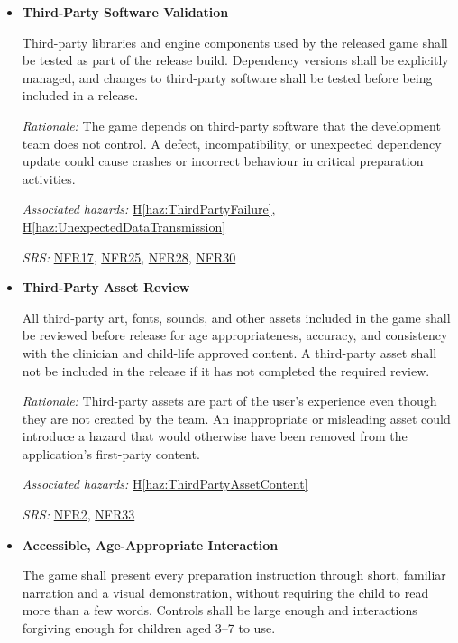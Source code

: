 \documentclass{article}
\newcounter{hazard}
\newcommand{\hazref}[1]{\hyperref[haz:#1]{H\ref*{haz:#1}}}
\newcounter{sr}
\newcommand{\srdef}[1]{\refstepcounter{sr}\label{sr:#1}\textbf{SR-\thesr:}}
\newcommand{\srsurl}{https://team-hindsight.github.io/ophthamology-game/SRS/SRS.pdf}
\newcommand{\srsnfrref}[2]{\href{\srsurl\#nameddest=#1}{NFR#2}}
\begin{document}
\begin{itemize}[leftmargin=1.5cm, labelwidth=1.3cm, labelsep=0.2cm,
  align=left, itemsep=1.2em, parsep=0.6em]
\textit{SRS:} \srsnfrref{NFR_DataProtection}{26}, \srsnfrref{NFR_Privacy}{28}, \srsnfrref{NFR_Minimization}{29}

\item[\srdef{ThirdPartyValidation}]
\textbf{Third-Party Software Validation}

Third-party libraries and engine components
used by the released game shall be tested as
part of the release build. Dependency versions
shall be explicitly managed, and changes to
third-party software shall be tested before
being included in a release.

\textit{Rationale:}
The game depends on third-party software that
the development team does not control. A defect,
incompatibility, or unexpected dependency update
could cause crashes or incorrect behaviour in
critical preparation activities.

\textit{Associated hazards:}
\hazref{ThirdPartyFailure}, \hazref{UnexpectedDataTransmission}

\textit{SRS:} \srsnfrref{NFR_Reliability}{17}, \srsnfrref{NFR_DependencyTesting}{25}, \srsnfrref{NFR_Privacy}{28}, \srsnfrref{NFR_Immunity}{30}

\item[\srdef{ThirdPartyAssetReview}]
\textbf{Third-Party Asset Review}

All third-party art, fonts, sounds, and other
assets included in the game shall be reviewed
before release for age appropriateness,
accuracy, and consistency with the clinician
and child-life approved content. A third-party
asset shall not be included in the release if
it has not completed the required review.

\textit{Rationale:}
Third-party assets are part of the user's
experience even though they are not created by
the team. An inappropriate or misleading asset
could introduce a hazard that would otherwise
have been removed from the application's
first-party content.

\textit{Associated hazards:}
\hazref{ThirdPartyAssetContent}

\textit{SRS:} \srsnfrref{NFR_ChildSafe}{2}, \srsnfrref{NFR_Licensing}{33}

\item[\srdef{AccessibleInteraction}]
\textbf{Accessible, Age-Appropriate Interaction}

The game shall present every preparation instruction through
short, familiar narration and a visual demonstration, without
requiring the child to read more than a few words. Controls shall be large enough
and interactions forgiving enough for children aged 3--7 to use.


\end{itemize}
\end{document}
